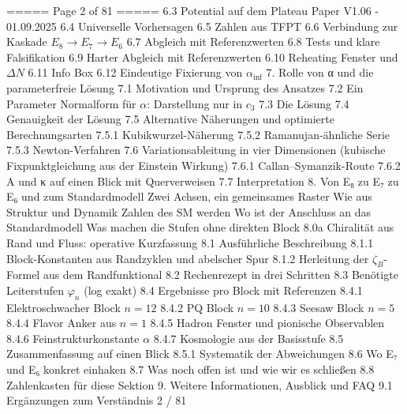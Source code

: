 \begin{MyVerbatim}
===== Page 2 of 81 =====
6.3 Potential auf dem Plateau
Paper V1.06 - 01.09.2025
6.4 Universelle Vorhersagen
6.5 Zahlen aus TFPT
6.6 Verbindung zur Kaskade $E_{8}\to E_{7}\to E_{6}$
6.7 Abgleich mit Referenzwerten
6.8 Tests und klare Falsifikation
6.9 Harter Abgleich mit Referenzwerten
6.10 Reheating Fenster und $\Delta N$
6.11 Info Box
6.12 Eindeutige Fixierung von $\alpha_{\text{inf}}$
7. Rolle von α und die parameterfreie Lösung
7.1 Motivation und Ursprung des Ansatzes
7.2 Ein Parameter Normalform für $\alpha$: Darstellung nur in $c_{3}$
7.3 Die Lösung
7.4 Genauigkeit der Lösung
7.5 Alternative Näherungen und optimierte Berechnungsarten
7.5.1 Kubikwurzel-Näherung
7.5.2 Ramanujan-ähnliche Serie
7.5.3 Newton-Verfahren
7.6 Variationsableitung in vier Dimensionen (kubische Fixpunktgleichung aus der Einstein Wirkung)
7.6.1 Callan–Symanzik-Route
7.6.2 A und κ auf einen Blick mit Querverweisen
7.7 Interpretation
8. Von E₈ zu E₇ zu E₆ und zum Standardmodell
Zwei Achsen, ein gemeinsames Raster
Wie aus Struktur und Dynamik Zahlen des SM werden
Wo ist der Anschluss an das Standardmodell
Was machen die Stufen ohne direkten Block
8.0a Chiralität aus Rand und Fluss: operative Kurzfassung
8.1 Ausführliche Beschreibung
8.1.1 Block-Konstanten aus Randzyklen und abelscher Spur
8.1.2 Herleitung der $\zeta_{B}$-Formel aus dem Randfunktional
8.2 Rechenrezept in drei Schritten
8.3 Benötigte Leiterstufen $\varphi_n$ (log exakt)
8.4 Ergebnisse pro Block mit Referenzen
8.4.1 Elektroschwacher Block $n=12$
8.4.2 PQ Block $n=10$
8.4.3 Seesaw Block $n=5$
8.4.4 Flavor Anker aus $n=1$
8.4.5 Hadron Fenster und pionische Observablen
8.4.6 Feinstrukturkonstante $\alpha$
8.4.7 Kosmologie aus der Basisstufe
8.5 Zusammenfassung auf einen Blick
8.5.1 Systematik der Abweichungen
8.6 Wo E₇ und E₆ konkret einhaken
8.7 Was noch offen ist und wie wir es schließen
8.8 Zahlenkasten für diese Sektion
9. Weitere Informationen, Ausblick und FAQ
9.1 Ergänzungen zum Verständnis
2 / 81


\end{MyVerbatim}
